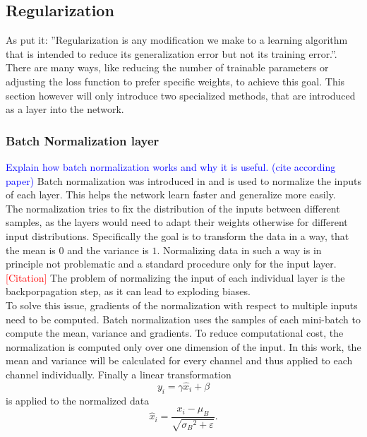 \subsection{Regularization}\label{sec:regularization}
As \cite{deep_learning_book} put it: ''Regularization is any modification we make to a learning algorithm that is intended to reduce its generalization error but not its training error.''. There are many ways, like reducing the number of trainable parameters or adjusting the loss function to prefer specific weights, to achieve this goal. This section however will only introduce two specialized methods, that are introduced as a layer into the network.

\subsubsection{Batch Normalization layer}\label{sec:batch_norm}
\textcolor{blue}{Explain how batch normalization works and why it is useful. (cite according paper)}
Batch normalization was introduced in \cite{batch_normalization_invention} and is used to normalize the inputs of each layer. This helps the network learn faster and generalize more easily.\\
The normalization tries to fix the distribution of the inputs between different samples, as the layers would need to adapt their weights otherwise for different input distributions. Specifically the goal is to transform the data in a way, that the mean is $0$ and the variance is $1$. Normalizing data in such a way is in principle not problematic and a standard procedure only for the input layer. \textcolor{red}{[Citation]} The problem of normalizing the input of each individual layer is the backporpagation step, as it can lead to exploding biases. \cite{batch_normalization_invention}\\
To solve this issue, gradients of the normalization with respect to multiple inputs need to be computed. Batch normalization uses the samples of each mini-batch to compute the mean, variance and gradients. To reduce computational cost, the normalization is computed only over one dimension of the input. In this work, the mean and variance will be calculated for every channel and thus applied to each channel individually. Finally a linear transformation
\begin{equation}
y_i = \gamma \hat{x}_i + \beta
\end{equation}
is applied to the normalized data
\begin{equation}
\hat{x}_i = \frac{x_i - \mu_B}{\sqrt{{\sigma_B}^2 + \varepsilon}}.
\end{equation}
